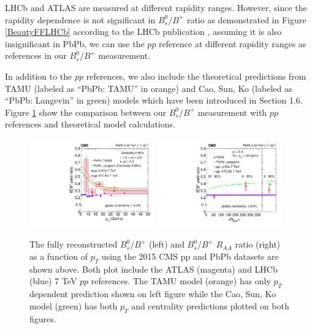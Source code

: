 LHCb and ATLAS are measured at different rapidity ranges. However, since the rapidity dependence is not significant in $B^0_s/B^+$ ratio as demonstrated in Figure \ref{BeautyFFLHCb} according to the LHCb publication \cite{LHCbFF}, assuming it is also insignificant in PbPb, we can use the $pp$ reference at different rapidity ranges as references in our $B^0_s/B^+$ measurement.

In addition to the $pp$ references, we also include the theoretical predictions from TAMU (labeled as ``PbPb: TAMU'' in orange) and Cao, Sun, Ko (labeled as ``PbPb: Langevin'' in green) models which have been introduced in Section 1.6. Figure \ref{FinalResults} show the comparison between our $B^0_s/B^+$ measurement with $pp$ references and theoretical model calculations. 

\begin{figure}[hbtp]
\begin{center}
\includegraphics[width=0.48\textwidth]{Figures/Chapter6/ratio_vsPt_ref1_1.pdf}
\includegraphics[width=0.48\textwidth]{Figures/Chapter6/ratio_vsCent_ref1.pdf}
\caption{The fully reconstructed $B^0_s/B^+$ (left) and $B^0_s/B^+$ $R_{AA}$ ratio (right) as a function of $p_T$ using the 2015 CMS pp and PbPb datasets are shown above. Both plot include the ATLAS (magenta) and LHCb (blue) 7 TeV $pp$ references. The TAMU model (orange) has only $p_T$ dependent prediction shown on left figure while the Cao, Sun, Ko model (green) has both $p_T$ and centrality predictions plotted on both figures.}
\label{FinalResults}
\end{center}
\end{figure}   
 

